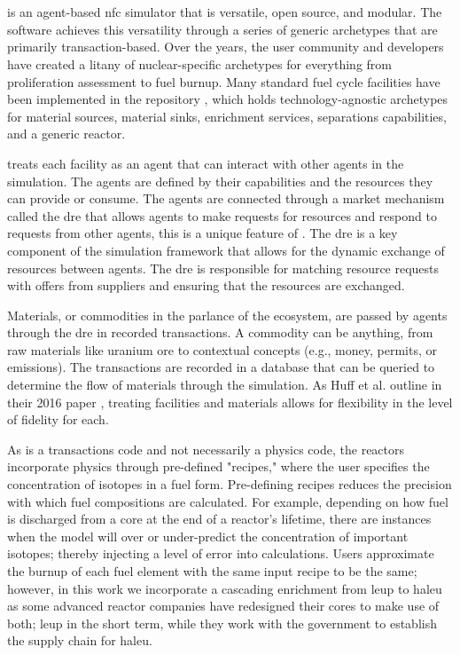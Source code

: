 \section{\cyclus}
\label{sec:cyclus}
\cyclus is an agent-based \gls{nfc} simulator that is versatile, open source,
and modular. The software achieves this versatility through a series of generic
archetypes that are primarily transaction-based. Over the years, the user
community and developers have created a litany of nuclear-specific archetypes
for everything from proliferation assessment to fuel burnup. Many standard fuel
cycle facilities have been implemented in the \cycamore repository
\cite{Carlsen_cycamore_2014}, which holds technology-agnostic archetypes for
material sources, material sinks, enrichment services, separations
capabilities, and a generic reactor.

\cyclus treats each facility as an agent that can interact with other agents in
the simulation. The agents are defined by their capabilities and the resources
they can provide or consume. The agents are connected through a market
mechanism called the \gls{dre} that allows agents to make requests for
resources and respond to requests from other agents, this is a unique feature
of \cyclus. The \gls{dre} is a key component of the \cyclus simulation
framework that allows for the dynamic exchange of resources between agents. The
\gls{dre} is responsible for matching resource requests with offers from
suppliers and ensuring that the resources are exchanged.

Materials, or commodities in the parlance of the \cyclus ecosystem, are passed
by agents through the \gls{dre} in recorded transactions. A commodity can be
anything, from raw materials like uranium ore to contextual concepts (e.g.,
money, permits, or emissions). The transactions are recorded
in a database that can be queried to determine the flow of materials through
the simulation. As Huff et al. outline in their 2016 paper
\cite{huff_cyclus_intro_2016}, treating facilities and materials allows for
flexibility in the level of fidelity for each.

As \cyclus is a transactions code and not necessarily a physics code,
the reactors incorporate physics through pre-defined "recipes,"
where the user specifies the concentration of isotopes in a fuel form.
Pre-defining recipes reduces the precision with which
fuel compositions are calculated. For example, depending on how fuel is
discharged from a core at the end of a reactor's lifetime, there are
instances when the model will over or under-predict the concentration of
important isotopes; thereby injecting a level of error into calculations.
Users approximate the burnup of each fuel element with the same input recipe to be the same; however, in this work we incorporate a cascading enrichment from
\gls{leup} to \gls{haleu} as some advanced reactor companies have
redesigned their cores to make use of both; \gls{leup} in the short term,
while they work with the government to establish the supply chain for
\gls{haleu}.

